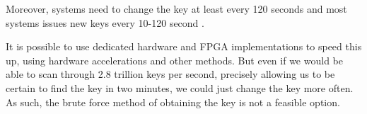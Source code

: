 Moreover, systems need to change the key at least every 120 seconds \citep{Simpson:2009} and most systems issues new keys every 10-120 second \citep{Wirt:2004}.

It is possible to use dedicated hardware and FPGA implementations to speed this 
up, using hardware accelerations and other methods. But even if we would be able 
to scan through 2.8 trillion keys per second, precisely allowing us to be certain
to find the key in two minutes, we could just change the key more often. As such,
the brute force method of obtaining the key is not a feasible option.



